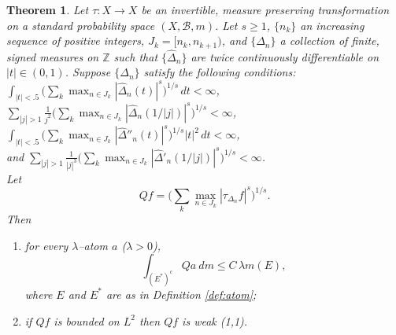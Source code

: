 \documentclass[11pt]{amsart}
\newtheorem{thm}{Theorem}[section]
\theoremstyle{definition}
\theoremstyle{remark}
\begin{document}
\begin{thm}\label{thm:ergodic_key} %
Let $\tau:X\to X$ be an invertible, measure preserving  transformation on a standard probability space $(X,\mathcal B,m)$. 
Let $s\ge 1$, $\{n_k\}$ an increasing sequence of positive integers, $J_k=[n_k,n_{k+1})$, 
and $\{\Delta_n\}$ a collection of finite, signed measures on $\mathbb Z$ such that $\{\hat \Delta_n\}$ are twice continuously differentiable on $|t|\in(0,1)$. Suppose $\{\Delta_n\}$ 
satisfy the following conditions:\\
$\int_{|t|<.5} \big( \sum_k  \max_{n\in J_k} |\hat \Delta_n(t)|^s \big)^{1/s} \, dt<\infty$, \\
$\sum_{|j|>1} \frac 1{j^2}  \big( \sum_k \max_{n\in J_k} |\hat \Delta_n(1/|j|)|^s \big)^{1/s}<\infty$,\\
$\int_{|t|<.5} \big( \sum_k \max_{n\in J_k} |\hat \Delta''_n(t)|^s \big)^{1/s}|t|^2 \, dt<\infty$, \\
and $\sum_{|j|>1} \frac 1{|j|^3}  \big( \sum_k \max_{n\in J_k} |\hat \Delta'_n(1/|j|)|^s \big)^{1/s}<\infty$.  \\
 Let \[Qf=\Big(\sum_k\max_{n\in J_k} |\tau_{\Delta_n} f |^s \Big)^{1/s}.\] Then
\begin{enumerate}
\item for every $\lambda$--atom $a$ ($\lambda>0$), 
\begin{equation*} \int_{(E^*)^c} Qa\ dm \le C \, \lambda m(E), %
\end{equation*}
where %
$E$ and $E^*$ are as in Definition \ref{def:atom}; 
\item if  $Qf$ is bounded on $L^2$
then $Qf$ is weak (1,1).
 \end{enumerate}
\end{thm}
\end{document}
